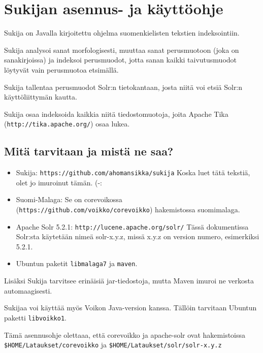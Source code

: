\documentclass[12pt]{article}
\begin{document}
\pagestyle{fancy}
\setlength{\parindent}{0pt}
\setlength{\parskip}{1ex plus 0.5ex minus 0.2ex}
\section*{Sukijan asennus- ja käyttöohje}


Sukija on Javalla kirjoitettu ohjelma suomenkielisten tekstien
indeksointiin.

Sukija analysoi sanat morfologisesti, muuttaa sanat perusmuotoon (joka
on sanakirjoissa) ja indeksoi perusmuodot, jotta sanan kaikki
taivutusmuodot löytyvät vain perusmuotoa etsimällä.

Sukija tallentaa perusmuodot Solr:n tietokantaan, josta niitä voi
etsiä Solr:n käyttöliittymän kautta.

Sukija osaa indeksoida kaikkia niitä tiedostomuotoja, joita Apache
Tika (\verb=http://tika.apache.org/=) osaa lukea.

\subsection*{Mitä tarvitaan ja mistä ne saa?}

\begin{itemize}

\item Sukija:
      \verb=https://github.com/ahomansikka/sukija=
      Koska luet tätä tekstiä, olet jo imuroinut tämän. (-:

\item Suomi-Malaga: Se on corevoikossa
      (\verb=https://github.com/voikko/corevoikko=)
      hakemistossa suomimalaga.

\item Apache Solr 5.2.1:
      \verb=http://lucene.apache.org/solr/=
      Tässä dokumentissa Solr:sta käytetään nimeä solr-x.y.z,
      missä x.y.z on version numero, esimerkiksi 5.2.1.

\item Ubuntun paketit \verb=libmalaga7= ja \verb=maven=.
\end{itemize}

Lisäksi Sukija tarvitsee erinäisiä jar-tiedostoja, mutta Maven imuroi
ne verkosta automaagisesti.

Sukijaa voi käyttää myös Voikon Java-version kanssa. Tällöin tarvitaan
Ubuntun paketti \verb=libvoikko1=.

Tämä asennusohje olettaaa, että corevoikko ja apache-solr ovat hakemistoissa
\verb=$HOME/Lataukset/corevoikko= ja
\verb=$HOME/Lataukset/solr/solr-x.y.z=
\end{document}
